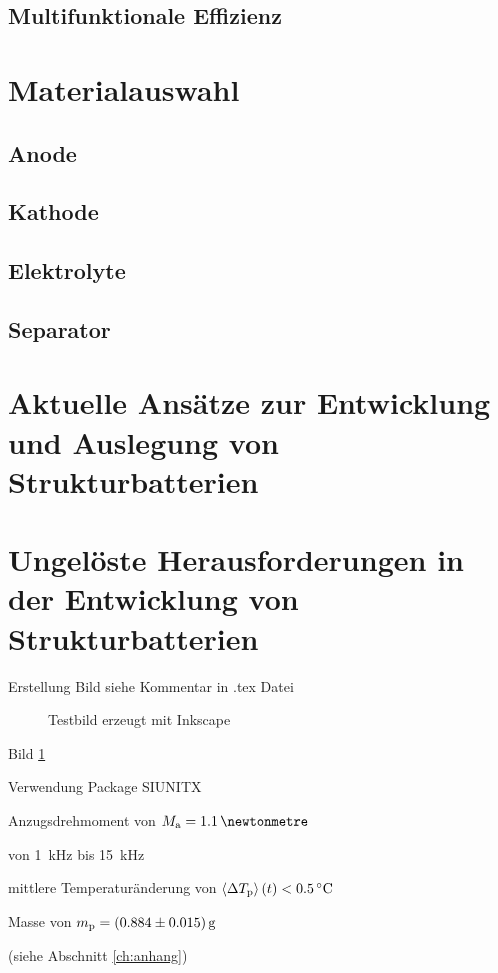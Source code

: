 \subsection{Multifunktionale Effizienz}

\section{Materialauswahl}
\subsection{Anode}
\subsection{Kathode}
\subsection{Elektrolyte}
\subsection{Separator}


\section{Aktuelle Ansätze zur Entwicklung und Auslegung von Strukturbatterien}

\section{Ungelöste Herausforderungen in der Entwicklung von Strukturbatterien}
Erstellung Bild siehe Kommentar in .tex Datei


\begin{figure}[h]
	\def\svgscale{0.98}
		 
		\caption{\label{fig:testbild}Testbild erzeugt mit Inkscape}
\end{figure}

Bild \ref{fig:testbild} %

Verwendung Package SIUNITX %

Anzugsdrehmoment von $M_{\textnormal{a}}=\SI{1.1}{\newtonmetre}$

von \SI{1}{\kilo\hertz} bis \SI{15}{\kilo\hertz}

mittlere Temperaturänderung von $\left\langle \Delta T_{\textnormal{p}}\right\rangle(t)<\SI{0.5}{\degreeCelsius}$

Masse von $m_{\textnormal{p}}=\SI[separate-uncertainty]{0.884 (15)}{\gram}$

(siehe Abschnitt \ref{ch:anhang})